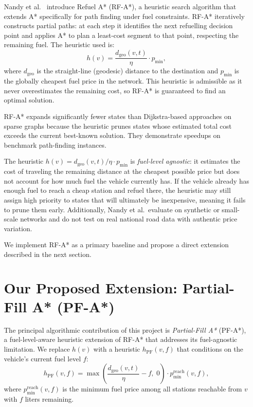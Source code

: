 Nandy et al.~\cite{nandy2023} introduce Refuel A* (RF-A*), a heuristic search algorithm
that extends A* specifically for path finding under fuel constraints.
RF-A* iteratively constructs partial paths: at each step it identifies the next refuelling
decision point and applies A* to plan a least-cost segment to that point, respecting the
remaining fuel.
The heuristic used is:
\[
    h(v) = \frac{d_{\mathrm{geo}}(v, t)}{\eta} \cdot p_{\min},
\]
where $d_{\mathrm{geo}}$ is the straight-line (geodesic) distance to the destination and
$p_{\min}$ is the globally cheapest fuel price in the network.
This heuristic is admissible as it never overestimates the remaining cost, so RF-A* is
guaranteed to find an optimal solution.

RF-A* expands significantly fewer states than Dijkstra-based approaches on sparse graphs
because the heuristic prunes states whose estimated total cost exceeds the current
best-known solution.
They demonstrate speedups on benchmark path-finding instances.

The heuristic $h(v) = d_{\mathrm{geo}}(v,t)/\eta \cdot p_{\min}$ is \emph{fuel-level agnostic}:
it estimates the cost of traveling the remaining distance at the cheapest possible price but
does not account for how much fuel the vehicle currently has.
If the vehicle already has enough fuel to reach a cheap station and refuel there, the heuristic
may still assign high priority to states that will ultimately be inexpensive, meaning it fails to
prune them early.
Additionally, Nandy et al.\ evaluate on synthetic or small-scale networks and do not test on
real national road data with authentic price variation.

We implement RF-A* as a primary baseline and propose a direct extension described in the
next section.

\section{Our Proposed Extension: Partial-Fill A* (PF-A*)}
\label{sec:pfa_overview}

The principal algorithmic contribution of this project is \textit{Partial-Fill A*} (PF-A*), a
fuel-level-aware heuristic extension of RF-A* that addresses its fuel-agnostic limitation.
We replace $h(v)$ with a heuristic $h_{\mathrm{PF}}(v, f)$ that conditions on the vehicle's
current fuel level $f$:
\[
    h_{\mathrm{PF}}(v, f)
    = \max\!\left(\frac{d_{\mathrm{geo}}(v, t)}{\eta} - f,\; 0\right)
      \cdot p_{\min}^{\mathrm{reach}}(v, f),
\]
where $p_{\min}^{\mathrm{reach}}(v, f)$ is the minimum fuel price among all stations reachable
from $v$ with $f$ liters remaining.

